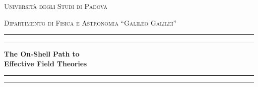 \begin{titlepage} %

	\centering %
	
 {\LARGE \scshape Università degli Studi di Padova}
 
 \vspace{.5\baselineskip}
 
 {\Large \scshape Dipartimento di Fisica e Astronomia ``Galileo Galilei''}
	
	\vspace*{1.5\baselineskip} %
	
	
	\rule{\textwidth}{1.6pt}\vspace*{-\baselineskip}\vspace*{2pt} %
	\rule{\textwidth}{0.4pt} %
	
	\vspace{0.75\baselineskip} %
	
	{\Huge \bfseries \fontsections
    The On-Shell Path to\\ Effective Field Theories\\} %
	
	\vspace{0.75\baselineskip} %
	
	\rule{\textwidth}{0.4pt}\vspace*{-\baselineskip}\vspace{3.2pt} %
	\rule{\textwidth}{1.6pt} %
	
	\vspace{2\baselineskip} %
	
	


\end{titlepage}
